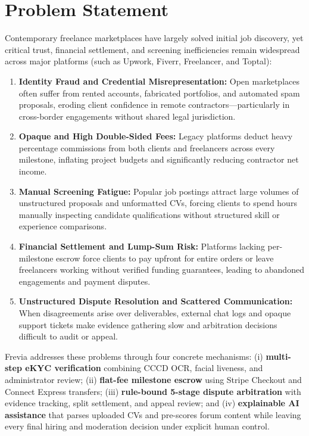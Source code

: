 \section{Problem Statement}

Contemporary freelance marketplaces have largely solved initial job discovery, yet critical trust, financial settlement, and screening inefficiencies remain widespread across major platforms (such as Upwork, Fiverr, Freelancer, and Toptal):

\begin{enumerate}[leftmargin=1.2cm, itemsep=4pt]
    \item \textbf{Identity Fraud and Credential Misrepresentation:} Open marketplaces often suffer from rented accounts, fabricated portfolios, and automated spam proposals, eroding client confidence in remote contractors---particularly in cross-border engagements without shared legal jurisdiction.
    \item \textbf{Opaque and High Double-Sided Fees:} Legacy platforms deduct heavy percentage commissions from both clients and freelancers across every milestone, inflating project budgets and significantly reducing contractor net income.
    \item \textbf{Manual Screening Fatigue:} Popular job postings attract large volumes of unstructured proposals and unformatted CVs, forcing clients to spend hours manually inspecting candidate qualifications without structured skill or experience comparisons.
    \item \textbf{Financial Settlement and Lump-Sum Risk:} Platforms lacking per-milestone escrow force clients to pay upfront for entire orders or leave freelancers working without verified funding guarantees, leading to abandoned engagements and payment disputes.
    \item \textbf{Unstructured Dispute Resolution and Scattered Communication:} When disagreements arise over deliverables, external chat logs and opaque support tickets make evidence gathering slow and arbitration decisions difficult to audit or appeal.
\end{enumerate}

Frevia addresses these problems through four concrete mechanisms: (i) \textbf{multi-step eKYC verification} combining CCCD OCR, facial liveness, and administrator review; (ii) \textbf{flat-fee milestone escrow} using Stripe Checkout and Connect Express transfers; (iii) \textbf{rule-bound 5-stage dispute arbitration} with evidence tracking, split settlement, and appeal review; and (iv) \textbf{explainable AI assistance} that parses uploaded CVs and pre-scores forum content while leaving every final hiring and moderation decision under explicit human control.

